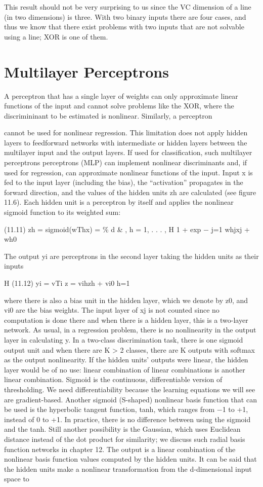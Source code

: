 This result should not be very surprising to us since the VC dimension of a line (in two dimensions) is three. With two binary inputs there are four cases, and thus we know that there exist problems with two inputs that are not solvable using a line; XOR is one of them.

\section{Multilayer Perceptrons}

A perceptron that has a single layer of weights can only approximate linear functions of the input and cannot solve problems like the XOR, where the discrimininant to be estimated is nonlinear. Similarly, a perceptron

cannot be used for nonlinear regression. This limitation does not apply hidden layers to feedforward networks with intermediate or hidden layers between the multilayer input and the output layers. If used for classification, such multilayer perceptrons perceptrons (MLP) can implement nonlinear discriminants and, if used for regression, can approximate nonlinear functions of the input. Input x is fed to the input layer (including the bias), the “activation” propagates in the forward direction, and the values of the hidden units zh are calculated (see figure 11.6). Each hidden unit is a perceptron by itself and applies the nonlinear sigmoid function to its weighted sum:

(11.11) zh = sigmoid(wThx) = \% d \& , h = 1, . . . , H 1 + exp $-$ j=1 whjxj + wh0

The output yi are perceptrons in the second layer taking the hidden units as their inputs

H (11.12) yi = vTi z = vihzh + vi0 h=1

where there is also a bias unit in the hidden layer, which we denote by z0, and vi0 are the bias weights. The input layer of xj is not counted since no computation is done there and when there is a hidden layer, this is a two-layer network. As usual, in a regression problem, there is no nonlinearity in the output layer in calculating y. In a two-class discrimination task, there is one sigmoid output unit and when there are K > 2 classes, there are K outputs with softmax as the output nonlinearity. If the hidden units’ outputs were linear, the hidden layer would be of no use: linear combination of linear combinations is another linear combination. Sigmoid is the continuous, differentiable version of thresholding. We need differentiability because the learning equations we will see are gradient-based. Another sigmoid (S-shaped) nonlinear basis function that can be used is the hyperbolic tangent function, tanh, which ranges from $-$1 to +1, instead of 0 to +1. In practice, there is no difference between using the sigmoid and the tanh. Still another possibility is the Gaussian, which uses Euclidean distance instead of the dot product for similarity; we discuss such radial basis function networks in chapter 12. The output is a linear combination of the nonlinear basis function values computed by the hidden units. It can be said that the hidden units make a nonlinear transformation from the d-dimensional input space to

